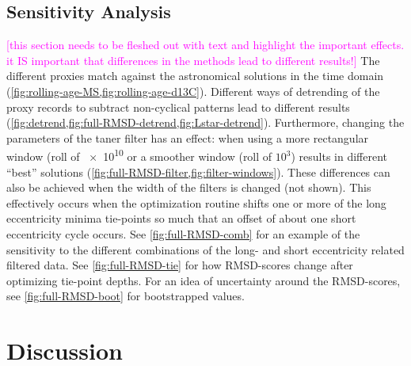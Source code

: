 \documentclass[draft]{agujournal2019}
\newcommand{\rez}{\textcolor{magenta}}
\begin{document}
\subsection{Sensitivity Analysis}

\rez{[this section needs to be fleshed out with text and highlight the important effects. it IS important
that differences in the methods lead to different results!]}
The different proxies match against the astronomical solutions in the time domain (\cref{fig:rolling-age-MS,fig:rolling-age-d13C}).
Different ways of detrending of the proxy records to subtract non-cyclical patterns lead to different results (\cref{fig:detrend,fig:full-RMSD-detrend,fig:Lstar-detrend}).
Furthermore, changing the parameters of the taner filter has an effect: when using a more rectangular window (roll of \num{e10} or a smoother window (roll of \(10^{3}\)) results in different ``best'' solutions (\cref{fig:full-RMSD-filter,fig:filter-windows}).
These differences can also be achieved when the width of the filters is changed (not shown). %
This effectively occurs when the optimization routine shifts one or more of the long eccentricity minima tie-points so much that an offset of about one short eccentricity cycle occurs.
See \cref{fig:full-RMSD-comb} for an example of the sensitivity to the different combinations of the long- and short eccentricity related filtered data.
See \cref{fig:full-RMSD-tie} for how \gls{RMSD}-scores change after optimizing tie-point depths.
For an idea of uncertainty around the \gls{RMSD}-scores, see \cref{fig:full-RMSD-boot} for bootstrapped values.

\section{Discussion}\label{sec:discussion}
\end{document}
